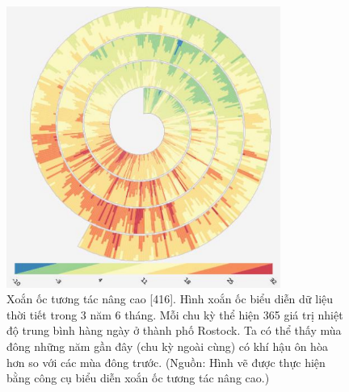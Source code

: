 \begin{figure}[H] %
    \centering %
    \includegraphics[width=0.8\textwidth]{assets/fig_7_9.png} 
    \caption{Xoắn ốc tương tác nâng cao [416]. Hình xoắn ốc biểu diễn dữ liệu thời tiết trong 3 năm 6 tháng. Mỗi chu kỳ thể hiện 365 giá trị nhiệt độ trung bình hàng ngày ở thành phố Rostock. Ta có thể thấy mùa đông những năm gần đây (chu kỳ ngoài cùng) có khí hậu ôn hòa hơn so với các mùa đông trước. (Nguồn: Hình vẽ được thực hiện bằng công cụ biểu diễn xoắn ốc tương tác nâng cao.)} %
    \label{fig:f7.9}
\end{figure}